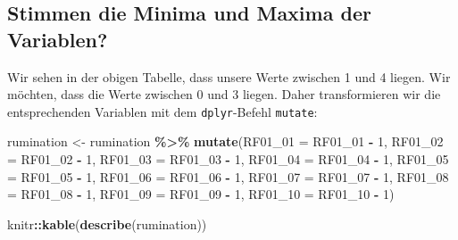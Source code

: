 \documentclass[
  ngerman,
]{book}
\newenvironment{Shaded}{\begin{snugshade}}{\end{snugshade}}
\newcommand{\AttributeTok}[1]{\textcolor[rgb]{0.13,0.29,0.53}{#1}}
\newcommand{\DecValTok}[1]{\textcolor[rgb]{0.00,0.00,0.81}{#1}}
\newcommand{\FunctionTok}[1]{\textcolor[rgb]{0.13,0.29,0.53}{\textbf{#1}}}
\newcommand{\NormalTok}[1]{#1}
\newcommand{\OtherTok}[1]{\textcolor[rgb]{0.56,0.35,0.01}{#1}}
\newcommand{\SpecialCharTok}[1]{\textcolor[rgb]{0.81,0.36,0.00}{\textbf{#1}}}
\begin{document}
\subsection{Stimmen die Minima und Maxima der Variablen?}\label{stimmen-die-minima-und-maxima-der-variablen}

Wir sehen in der obigen Tabelle, dass unsere Werte zwischen 1 und 4 liegen. Wir möchten, dass die Werte zwischen 0 und 3 liegen. Daher transformieren wir die entsprechenden Variablen mit dem \texttt{dplyr}-Befehl \texttt{mutate}:

\begin{Shaded}
\begin{Highlighting}[]
\NormalTok{rumination }\OtherTok{\textless{}{-}}\NormalTok{ rumination }\SpecialCharTok{\%\textgreater{}\%}
  \FunctionTok{mutate}\NormalTok{(}\AttributeTok{RF01\_01 =}\NormalTok{ RF01\_01 }\SpecialCharTok{{-}} \DecValTok{1}\NormalTok{,}
         \AttributeTok{RF01\_02 =}\NormalTok{ RF01\_02 }\SpecialCharTok{{-}} \DecValTok{1}\NormalTok{,}
         \AttributeTok{RF01\_03 =}\NormalTok{ RF01\_03 }\SpecialCharTok{{-}} \DecValTok{1}\NormalTok{,}
         \AttributeTok{RF01\_04 =}\NormalTok{ RF01\_04 }\SpecialCharTok{{-}} \DecValTok{1}\NormalTok{,}
         \AttributeTok{RF01\_05 =}\NormalTok{ RF01\_05 }\SpecialCharTok{{-}} \DecValTok{1}\NormalTok{,}
         \AttributeTok{RF01\_06 =}\NormalTok{ RF01\_06 }\SpecialCharTok{{-}} \DecValTok{1}\NormalTok{,}
         \AttributeTok{RF01\_07 =}\NormalTok{ RF01\_07 }\SpecialCharTok{{-}} \DecValTok{1}\NormalTok{,}
         \AttributeTok{RF01\_08 =}\NormalTok{ RF01\_08 }\SpecialCharTok{{-}} \DecValTok{1}\NormalTok{,}
         \AttributeTok{RF01\_09 =}\NormalTok{ RF01\_09 }\SpecialCharTok{{-}} \DecValTok{1}\NormalTok{,}
         \AttributeTok{RF01\_10 =}\NormalTok{ RF01\_10 }\SpecialCharTok{{-}} \DecValTok{1}\NormalTok{)}

\NormalTok{knitr}\SpecialCharTok{::}\FunctionTok{kable}\NormalTok{(}\FunctionTok{describe}\NormalTok{(rumination))}
\end{Highlighting}
\end{Shaded}
\end{document}
